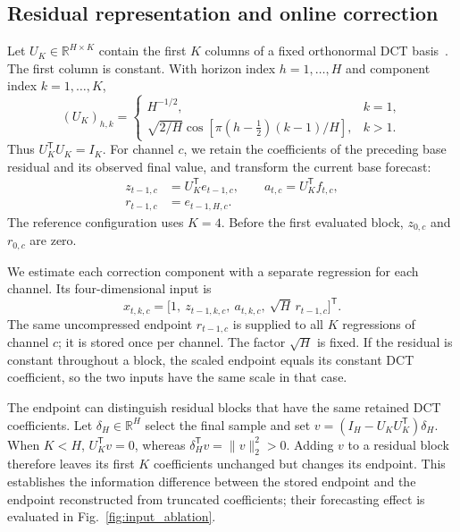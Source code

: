 \subsection{Residual representation and online correction}
Let $U_K\in\mathbb{R}^{H\times K}$ contain the first $K$ columns of a fixed orthonormal DCT basis~\cite{ahmed1974dct}. The first column is constant. With horizon index $h=1,\ldots,H$ and component index $k=1,\ldots,K$,
\begin{equation}
 (U_K)_{h,k}=\begin{cases}
 H^{-1/2}, & k=1,\\
 \sqrt{2/H}\cos\!\left[\pi(h-\tfrac12)(k-1)/H\right], & k>1.
 \end{cases}
 \label{eq:dct_basis}
\end{equation}
Thus $U_K^{\mathsf T}U_K=I_K$. For channel $c$, we retain the coefficients of the preceding base residual and its observed final value, and transform the current base forecast:
\begin{equation}
 \begin{split}
 z_{t-1,c}&=U_K^{\mathsf T}e_{t-1,c},\qquad
 a_{t,c}=U_K^{\mathsf T}f_{t,c},\\
 r_{t-1,c}&=e_{t-1,H,c}.
 \end{split}
 \label{eq:retained_features}
\end{equation}
The reference configuration uses $K=4$. Before the first evaluated block, $z_{0,c}$ and $r_{0,c}$ are zero.

We estimate each correction component with a separate regression for each channel. Its four-dimensional input is
\begin{equation}
 x_{t,k,c}=\bigl[1,\ z_{t-1,k,c},\ a_{t,k,c},\
 \sqrt{H}\,r_{t-1,c}\bigr]^{\mathsf T}.
 \label{eq:regression_input}
\end{equation}
The same uncompressed endpoint $r_{t-1,c}$ is supplied to all $K$ regressions of channel $c$; it is stored once per channel. The factor $\sqrt H$ is fixed. If the residual is constant throughout a block, the scaled endpoint equals its constant DCT coefficient, so the two inputs have the same scale in that case.

The endpoint can distinguish residual blocks that have the same retained DCT coefficients. Let $\delta_H\in\mathbb{R}^H$ select the final sample and set $v=(I_H-U_KU_K^{\mathsf T})\delta_H$. When $K<H$, $U_K^{\mathsf T}v=0$, whereas $\delta_H^{\mathsf T}v=\lVert v\rVert_2^2>0$. Adding $v$ to a residual block therefore leaves its first $K$ coefficients unchanged but changes its endpoint. This establishes the information difference between the stored endpoint and the endpoint reconstructed from truncated coefficients; their forecasting effect is evaluated in Fig.~\ref{fig:input_ablation}.

